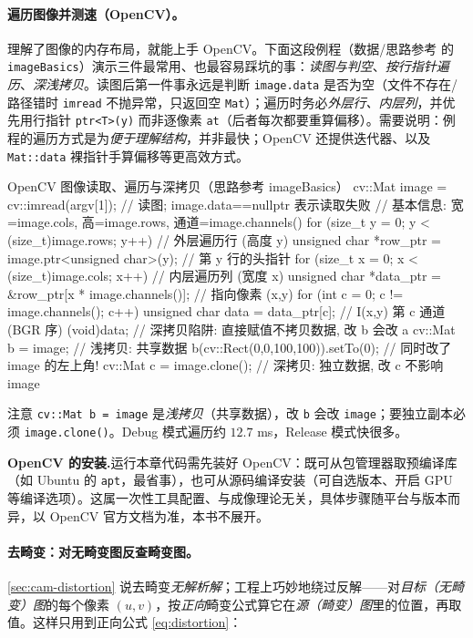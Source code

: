 \paragraph{遍历图像并测速（OpenCV）。}
理解了图像的内存布局，就能上手 OpenCV。下面这段例程（数据/思路参考\cite{gaoxiang2019slam14} 的 \texttt{imageBasics}）演示三件最常用、也最容易踩坑的事：\emph{读图与判空}、\emph{按行指针遍历}、\emph{深浅拷贝}。读图后第一件事永远是判断 \texttt{image.data} 是否为空（文件不存在/路径错时 \texttt{imread} 不抛异常，只返回空 \texttt{Mat}）；遍历时务必\emph{外层行、内层列}，并优先用行指针 \texttt{ptr<T>(y)} 而非逐像素 \texttt{at}（后者每次都要重算偏移）。需要说明：例程的遍历方式是为\emph{便于理解结构}，并非最快；OpenCV 还提供迭代器、以及 \texttt{Mat::data} 裸指针手算偏移等更高效方式。

\begin{codebox}[C++]{OpenCV 图像读取、遍历与深拷贝（思路参考 imageBasics）}
cv::Mat image = cv::imread(argv[1]);              // 读图; image.data==nullptr 表示读取失败
// 基本信息: 宽=image.cols, 高=image.rows, 通道=image.channels()
for (size_t y = 0; y < (size_t)image.rows; y++) { // 外层遍历行 (高度 y)
  unsigned char *row_ptr = image.ptr<unsigned char>(y);  // 第 y 行的头指针
  for (size_t x = 0; x < (size_t)image.cols; x++) {       // 内层遍历列 (宽度 x)
    unsigned char *data_ptr = &row_ptr[x * image.channels()]; // 指向像素 (x,y)
    for (int c = 0; c != image.channels(); c++) {
      unsigned char data = data_ptr[c];           // I(x,y) 第 c 通道 (BGR 序)
      (void)data;
    }
  }
}
// 深拷贝陷阱: 直接赋值不拷贝数据, 改 b 会改 a
cv::Mat b = image;            // 浅拷贝: 共享数据
b(cv::Rect(0,0,100,100)).setTo(0);   // 同时改了 image 的左上角!
cv::Mat c = image.clone();    // 深拷贝: 独立数据, 改 c 不影响 image
\end{codebox}

\noindent 注意 \texttt{cv::Mat b = image} 是\emph{浅拷贝}（共享数据），改 \texttt{b} 会改 \texttt{image}；要独立副本必须 \texttt{image.clone()}。Debug 模式遍历约 $12.7$ ms，Release 模式快很多\cite{gaoxiang2019slam14}。

\begin{note}
\textbf{OpenCV 的安装.}\;运行本章代码需先装好 OpenCV：既可从包管理器取预编译库（如 Ubuntu 的 \texttt{apt}，最省事），也可从源码编译安装（可自选版本、开启 GPU 等编译选项）。这属一次性工具配置、与成像理论无关，具体步骤随平台与版本而异，以 OpenCV 官方文档为准，本书不展开。
\end{note}

\paragraph{去畸变：对无畸变图反查畸变图。}
\cref{sec:cam-distortion} 说去畸变\emph{无解析解}；工程上巧妙地绕过反解——对\emph{目标（无畸变）图}的每个像素 $(u,v)$，按\emph{正向}畸变公式算它在\emph{源（畸变）图}里的位置，再取值。这样只用到正向公式 \cref{eq:distortion}：

